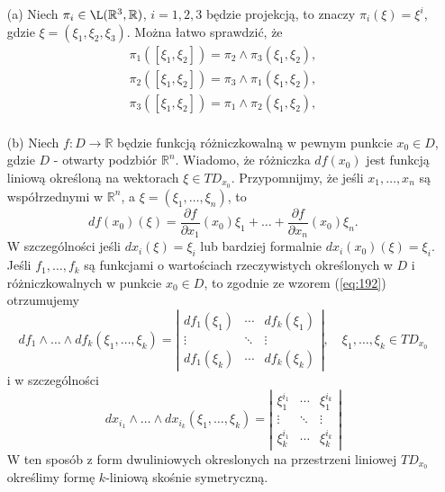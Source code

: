 \documentclass[leqno]{article}
\begin{document}
\begin{justify}
\begin{ex}
    \begin{itemize}
        \item [(a)]
            Niech $\pi_i \in \L(\mathbb{R}^3, \mathbb{R})$, $i =1,2,3$ będzie projekcją, to znaczy $\pi_i(\xi) = \xi^i$, gdzie $\xi = (\xi_1, \xi_2, \xi_3)$. Można 
            łatwo sprawdzić, że 
            \[
                \begin{aligned}
                    \pi_1([\xi_1, \xi_2]) = \pi_2 \land \pi_3(\xi_1, \xi_2), \\
                    \pi_2([\xi_1, \xi_2]) = \pi_3 \land \pi_1(\xi_1, \xi_2), \\
                    \pi_3([\xi_1, \xi_2]) = \pi_1 \land \pi_2(\xi_1, \xi_2), \\
                \end{aligned}
            \]
        \item [(b)]
            Niech $f : D \to \mathbb{R}$ będzie funkcją różniczkowalną w pewnym punkcie $x_0 \in D$, gdzie $D$ - otwarty podzbiór $\mathbb{R}^n$.
            Wiadomo, że różniczka $df(x_0)$ jest funkcją liniową określoną na wektorach $\xi \in TD_{x_0}$.
            Przypomnijmy, że jeśli $x_1, \ldots, x_n$ są współrzednymi w $\mathbb{R}^n$, a $\xi = (\xi_1, \ldots, \xi_n)$, to 
            \[
                df(x_0)(\xi) = \frac{\partial f}{\partial x_1}(x_0)\xi_1 + \ldots + \frac{\partial f}{\partial x_n}(x_0)\xi_n.
            \]
            W szczególności jeśli $dx_i(\xi) = \xi_i$ lub bardziej formalnie $dx_i(x_0)(\xi) = \xi_i$.
            Jeśli $f_1, \ldots, f_k$ są funkcjami o wartościach rzeczywistych określonych w $D$ i różniczkowalnych w punkcie $x_0 \in D$, to zgodnie ze wzorem (\ref{eq:192}) otrzumujemy 
            \[
                df_1 \land \ldots \land df_k(\xi_1, \ldots, \xi_k) = \left|\begin{array}{ccc}
                    df_1(\xi_1) & \cdots & df_k(\xi_1) \\
                   \vdots & \ddots & \vdots \\
                    df_1(\xi_k) & \cdots & df_k(\xi_k)
                    \end{array}\right|, \quad \xi_1, \ldots, \xi_k \in TD_{x_0}
            \]
            i w szczególności 
            \[
                dx_{i_1} \land \ldots \land dx_{i_k}(\xi_1, \ldots, \xi_k) = \left|\begin{array}{ccc}
                    \xi_1^{i_1} & \cdots & \xi_1^{i_k} \\
                   \vdots & \ddots & \vdots \\
                   \xi_k^{i_1}  & \cdots & \xi_k^{i_k} 
                    \end{array}\right|
            \]
            W ten sposób z form dwuliniowych okreslonych na przestrzeni liniowej $TD_{x_0}$ określimy formę $k$-liniową skośnie symetryczną.
    \end{itemize}
\end{ex}


\end{justify}
\end{document}
